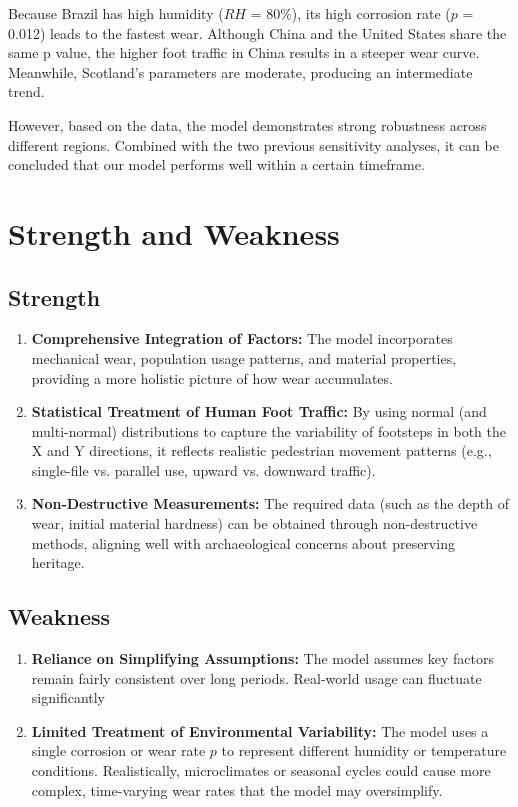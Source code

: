 \documentclass[12pt]{article}  %
\numberwithin{equation}{section} %
\begin{document}
Because Brazil has high humidity ($RH$ = 80\%), its high corrosion rate ($p$ = 0.012) leads to the fastest wear. Although China and the United States share the same p value, the higher foot traffic in China results in a steeper wear curve. Meanwhile, Scotland’s parameters are moderate, producing an intermediate trend.

However, based on the data, the model demonstrates strong robustness across different regions. Combined with the two previous sensitivity analyses, it can be concluded that our model performs well within a certain timeframe.
\section{Strength and Weakness}
\subsection{Strength}
\begin{enumerate}[\bfseries (1)]
	\setlength{\parsep}{0ex} %
	\setlength{\topsep}{-1ex} %
	\setlength{\itemsep}{0ex} %
	\item \textbf{Comprehensive Integration of Factors: }
    The model incorporates mechanical wear, population usage patterns, and material properties, providing a more holistic picture of how wear accumulates.
    \item \textbf{Statistical Treatment of Human Foot Traffic:}
    By using normal (and multi-normal) distributions to capture the variability of footsteps in both the X and Y directions, it reflects realistic pedestrian movement patterns (e.g., single-file vs. parallel use, upward vs. downward traffic).
    \item \textbf{Non-Destructive Measurements:}
    The required data (such as the depth of wear, initial material hardness) can be obtained through non-destructive methods, aligning well with archaeological concerns about preserving heritage.
\end{enumerate}


\subsection{Weakness}
\begin{enumerate}[\bfseries (1)]
	\setlength{\parsep}{0ex} %
	\setlength{\topsep}{-1ex} %
	\setlength{\itemsep}{0ex} %
	\item \textbf{Reliance on Simplifying Assumptions:} 
 The model assumes key factors remain fairly consistent over long periods. Real-world usage can fluctuate significantly 
     \item \textbf{Limited Treatment of Environmental Variability:}
     The model uses a single corrosion or wear rate $p$ to represent different humidity or temperature conditions. Realistically, microclimates or seasonal cycles could cause more complex, time-varying wear rates that the model may oversimplify.
\end{enumerate}
\end{document}
